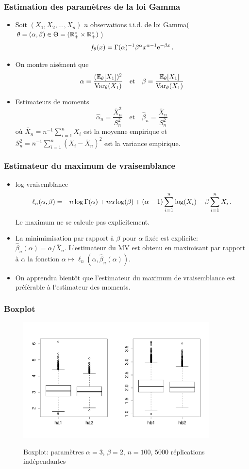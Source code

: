 \begin{frame}
\frametitle{Estimation des paramètres de la loi Gamma}
\begin{itemize}
\item Soit $(X_1,X_2,\dots,X_n)$ $n$ observations i.i.d. de loi Gamma($\theta=(\alpha,\beta) \in \Theta= (\mathbb{R}^*_+ \times \mathbb{R}_+^*)$)
\[
f_\theta(x) = \Gamma(\alpha)^{-1} \beta^\alpha x^{\alpha-1} \mathrm{e}^{-\beta x} \,.
\]
\item On montre aisément que
\[
\alpha = \frac{(\operatorname{{\mathbb E}}_\theta[X_1])^2}{\operatorname{\mathrm{Var}}_\theta(X_1)} \quad \text{et} \quad \beta = \frac{\operatorname{{\mathbb E}}_\theta[X_1]}{\operatorname{\mathrm{Var}}_\theta(X_1)}
\]
\item Estimateurs de moments
\[
\hat{\alpha}_n = \frac{\bar{X}^2_n}{S_n^2} \quad \text{et} \quad \hat{\beta}_n= \frac{\bar{X}_n}{S_n^2}
\]
où $\bar{X}_n= n ^{-1} \sum_{i=1}^n X_i$ est la \alert{moyenne empirique} et $S_n^2= n^{-1} \sum_{i=1}^n (X_i - \bar{X}_n)^2$ est \alert{la variance empirique}.
\end{itemize}
\end{frame}

\begin{frame}
\frametitle{Estimateur du maximum de vraisemblance}
\begin{itemize}
\item \alert{log-vraisemblance}
\[
\ell_n(\alpha,\beta)= - n \log \Gamma(\alpha) + n \alpha \log(\beta) + (\alpha-1) \sum_{i=1}^n \log(X_i) - \beta \sum_{i=1}^n X_i \,.
\]
\alert{Le maximum ne se calcule pas explicitement.}
\item La minimimisation par rapport à $\beta$  pour $\alpha$ fixée est explicite: $\hat{\beta}_n(\alpha)= \alpha / \bar{X}_n$. L'estimateur du MV est obtenu en maximisant par rapport à $\alpha$ la fonction $\alpha \mapsto \ell_n(\alpha,\hat{\beta}_n(\alpha))$.
\item On apprendra bientôt que l'estimateur du maximum de vraisemblance est préférable à l'estimateur des moments.
\end{itemize}
\end{frame}

\begin{frame}
\frametitle{Boxplot}
\begin{figure}
  \centering
  \includegraphics[width=0.9\textwidth]{boxplot1}\\
  \caption{Boxplot: paramètres $\alpha=3$, $\beta=2$, $n=100$, $5000$ réplications indépendantes}
\end{figure}
\end{frame}


